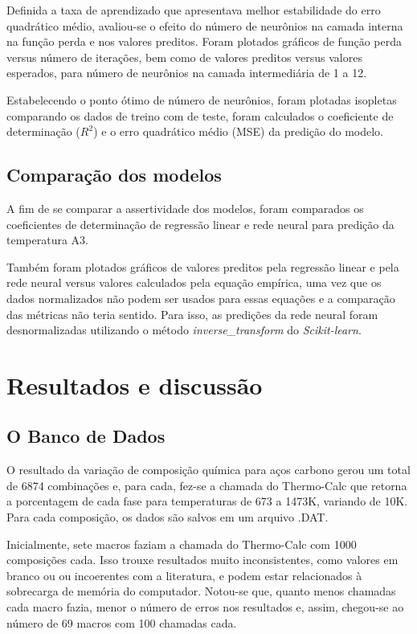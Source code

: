 \documentclass[brazil,tf,epusp]{usp}  %
\begin{document}
Definida a taxa de aprendizado que apresentava melhor estabilidade do erro quadrático médio, avaliou-se o efeito do número de neurônios na camada interna na função perda e nos valores preditos. Foram plotados gráficos de função perda versus número de iterações, bem como de valores preditos versus valores esperados, para número de neurônios na camada intermediária de 1 a 12.

Estabelecendo o ponto ótimo de número de neurônios, foram plotadas isopletas comparando os dados de treino com de teste, foram calculados o coeficiente de determinação ($R^{2}$) e o erro quadrático médio (MSE) da predição do modelo.

\section{Comparação dos modelos}

A fim de se comparar a assertividade dos modelos, foram comparados os coeficientes de determinação de regressão linear e rede neural para predição da temperatura A3.

Também foram plotados gráficos de valores preditos pela regressão linear e pela rede neural versus valores calculados pela equação empírica, uma vez que os dados normalizados não podem ser usados para essas equações e a comparação das métricas não teria sentido. Para isso, as predições da rede neural foram desnormalizadas utilizando o método \textit{inverse\_transform} do \textit{Scikit-learn}.


\chapter{Resultados e discussão}
\section{O Banco de Dados}
O resultado da variação de composição química para aços carbono gerou um total de 6874 combinações e, para cada, fez-se a chamada do Thermo-Calc\textregistered{} que retorna a porcentagem de cada fase para temperaturas de 673 a 1473K, variando de 10K. Para cada composição, os dados são salvos em um arquivo .DAT.

Inicialmente, sete macros faziam a chamada do Thermo-Calc\textregistered{} com 1000 composições cada. Isso trouxe resultados muito inconsistentes, como valores em branco ou ou incoerentes com a literatura, e podem estar relacionados à sobrecarga de memória do computador. Notou-se que, quanto menos chamadas cada macro fazia, menor o número de erros nos resultados e, assim, chegou-se ao número de 69 macros com 100 chamadas cada.
\end{document}
